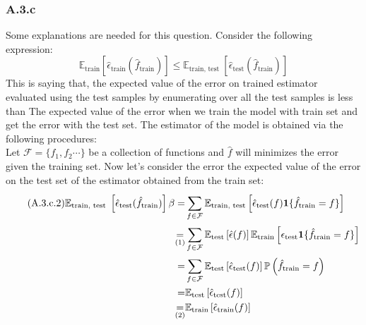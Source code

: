 \documentclass[]{article}
\begin{document}
    \subsubsection*{A.3.c}
        Some explanations are needed for this question. Consider the following expression: 
        \begin{equation*}\tag{A.3.c.1.1}\label{eqn:A.3.c.1.1}
            \mathbb{E}_\text{train} 
            \left[\hat{\epsilon}_\text{train}(\hat{f}_\text{train})\right]
            \le
            \mathbb{E}_{\text{train, test }}\left[
                \hat{\epsilon}_\text{test}
                (\hat{f}_\text{train})
            \right]
        \end{equation*}
        This is saying that, the expected value of the error on trained estimator evaluated using the test samples by enumerating over all the test samples is less than The expected value of the error when we train the model with train set and get the error with the test set. 
        The estimator of the model is obtained via the following procedures: 
        \\[1em]
        Let $\mathcal{F} = \{f_1, f_2\cdots\}$ be a collection of functions and $\hat{f}$ will minimizes the error given the training set. Now let's consider the error the expected value of the error on the test set of the estimator obtained from the train set: 
        \begin{align*}\tag{A.3.c.2}\label{eqn:A.3.c.2}
            \mathbb{E}_{\text{train, test }}\left[
                \hat{\epsilon}_\text{test}
                (\hat{f}_\text{train})
            \right]\beta
            = &
            \sum_{f\in\mathcal{F}}^{}\mathbb{E}_\text{train, test}
            \left[
                \hat{\epsilon}_{\text{\text{test}}}(f)\mathbf{1}\{\hat{f}_\text{train} = f\}
            \right]
            \\
            \underset{\text{(1)}}{=} &
            \sum_{f\in\mathcal{F}}^{}
            \mathbb{E}_\text{test}\left[
                \hat{\epsilon}(f)
            \right]
            \mathbb{E}_\text{train}\left[\epsilon_\text{test}
                \mathbf{1}\{\hat{f}_\text{train} = f\}
            \right]
            \\
            = &
            \sum_{f\in\mathcal{F}}^{}
            \mathbb{E}_\text{test}\left[
                \hat{\epsilon}_\text{test}(f)
            \right]
            \mathbb{P}\left(
                \hat{f}_\text{train} = f
            \right)
            \\
            = &
            \mathbb{E}_\text{test}\left[
                \hat{\epsilon}_\text{test}(f)
            \right]
            \\
            \underset{\text{(2)}}{=}&
            \mathbb{E}_\text{train}\left[
                \hat{\epsilon}_\text{train}(f)
            \right]
        \end{align*}
\end{document}
